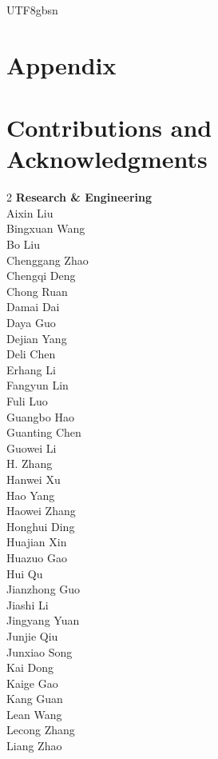 \documentclass[11pt, a4paper, logo, copyright, nonumbering]{deepseek}
\begin{document}
\begin{CJK*}{UTF8}{gbsn}


\newpage
\appendix

\section*{Appendix}

\section{Contributions and Acknowledgments}

\begin{multicols}{2} 
\noindent
\textbf{Research \& Engineering} \\
Aixin Liu \\
Bingxuan Wang \\
Bo Liu \\
Chenggang Zhao \\
Chengqi Deng \\
Chong Ruan \\
Damai Dai \\
Daya Guo \\
Dejian Yang \\
Deli Chen \\
Erhang Li \\
Fangyun Lin \\
Fuli Luo \\
Guangbo Hao \\
Guanting Chen \\
Guowei Li \\
H. Zhang \\
Hanwei Xu \\
Hao Yang \\
Haowei Zhang \\
Honghui Ding \\
Huajian Xin \\
Huazuo Gao \\
Hui Qu \\
Jianzhong Guo \\
Jiashi Li \\
Jingyang Yuan \\
Junjie Qiu \\
Junxiao Song \\
Kai Dong \\
Kaige Gao \\
Kang Guan \\
Lean Wang \\
Lecong Zhang \\
Liang Zhao \\

\end{multicols}
\end{CJK*}
\end{document}
